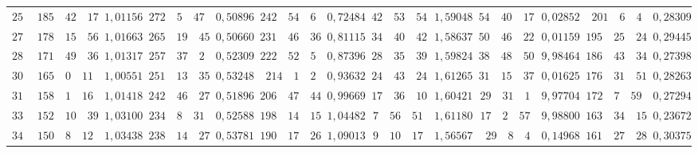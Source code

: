 \begin{landscape}
\begin{center}
\begin{tabular}{r|r|r|r|r|r|r|r|r|r|r|r|r}
\(255\) & \(185\quad 42\quad 17\) & \(1{,}01156\) & \(272\quad 5\quad 47\) & \(0{,}50896\) & \(242\quad 54\quad 6\) & \(0{,}72484\) & \(42\quad 53\quad 54\) & \(1{,}59048\) & \(54\quad 40\quad 17\) & \(0{,}02852\) & \(201\quad 6\quad 4\) & \(0{,}28309\) \\
\(270\) & \(178\quad 15\quad 56\) & \(1{,}01663\) & \(265\quad 19\quad 45\) & \(0{,}50660\) & \(231\quad 46\quad 36\) & \(0{,}81115\) & \(34\quad 40\quad 42\) & \(1{,}58637\) & \(50\quad 46\quad 22\) & \(0{,}01159\) & \(195\quad 25\quad 24\) & \(0{,}29445\) \\
\(285\) & \(171\quad 49\quad 36\) & \(1{,}01317\) & \(257\quad 37\quad 2\) & \(0{,}52309\) & \(222\quad 52\quad 5\) & \(0{,}87396\) & \(28\quad 35\quad 39\) & \(1{,}59824\) & \(38\quad 48\quad 50\) & \(9{,}98464\) & \(186\quad 43\quad 34\) & \(0{,}27398\) \\[3pt]
\(300\) & \(165\quad 0\quad 11\) & \(1{,}00551\) & \(251\quad 13\quad 35\) & \(0{,}53248\) & \(214\quad 1\quad 2\) & \(0{,}93632\) & \(24\quad 43\quad 24\) & \(1{,}61265\) & \(31\quad 15\quad 37\) & \(0{,}01625\) & \(176\quad 31\quad 51\) & \(0{,}28263\) \\
\(315\) & \(158\quad 1\quad 16\) & \(1{,}01418\) & \(242\quad 46\quad 27\) & \(0{,}51896\) & \(206\quad 47\quad 44\) & \(0{,}99669\) & \(17\quad 36\quad 10\) & \(1{,}60421\) & \(29\quad 31\quad 1\) & \(9{,}97704\) & \(172\quad 7\quad 59\) & \(0{,}27294\) \\
\(330\) & \(152\quad 10\quad 39\) & \(1{,}03100\) & \(234\quad 8\quad 31\) & \(0{,}52588\) & \(198\quad 14\quad 15\) & \(1{,}04482\) & \(7\quad 56\quad 51\) & \(1{,}61180\) & \(17\quad 2\quad 57\) & \(9{,}98800\) & \(163\quad 34\quad 15\) & \(0{,}23672\) \\
\(345\) & \(150\quad 8\quad 12\) & \(1{,}03438\) & \(238\quad 14\quad 27\) & \(0{,}53781\) & \(190\quad 17\quad 26\) & \(1{,}09013\) & \(9\quad 10\quad 17\) & \(1{,}56567\) & \(29\quad 8\quad 4\) & \(0{,}14968\) & \(161\quad 27\quad 28\) & \(0{,}30375\) \\
\end{tabular}
\end{center}
\endgroup
\end{landscape}
